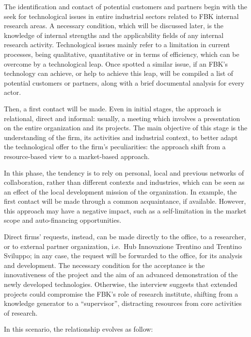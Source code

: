 The identification and contact of potential customers and partners begin with the seek for technological issues in entire industrial sectors related to FBK internal research areas. A necessary condition, which will be discussed later, is the knowledge of internal strengths and the applicability fields of any internal research activity. Technological issues mainly refer to a limitation in current processes, being qualitative, quantitative or in terms of efficiency, which can be overcome by a technological leap. Once spotted a similar issue, if an FBK's technology can achieve, or help to achieve this leap, will be compiled a list of potential customers or partners, along with a brief documental analysis for every actor. 

Then, a first contact will be made. Even in initial stages, the approach is relational, direct and informal: usually, a meeting which involves a presentation on the entire organization and its projects. The main objective of this stage is the understanding of the firm, its activities and industrial context, to better adapt the technological offer to the firm’s peculiarities: the approach shift from a resource-based view to a market-based approach.
 
In this phase, the tendency is to rely on personal, local and previous networks of collaboration, rather than different contexts and industries, which can be seen as an effect of the local development mission of the organization. In example, the first contact will be made through a common acquaintance, if available. However, this approach may have a negative impact, such as a self-limitation in the market scope and auto-financing opportunities.

Direct firms’ requests, instead, can be made directly to the office, to a researcher, or to external partner organization, i.e.\ Hub Innovazione Trentino and Trentino Sviluppo; in any case, the request will be forwarded to the office, for its analysis and development. The necessary condition for the acceptance is the innovativeness of the project and the aim of an advanced demonstration of the newly developed technologies. Otherwise, the interview suggests that extended projects could compromise the FBK's role of research institute, shifting from a knowledge generator to a \enquote{supervisor}, distracting resources from core activities of research.

In this scenario, the relationship evolves as follow:

